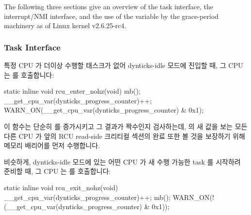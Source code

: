 The following three sections give an overview of the task
interface, the interrupt/NMI interface, and the use of
the  variable by the
grace-period machinery as of Linux kernel v2.6.25-rc4.

\fi

\subsubsection{Task Interface}
\label{sec:formal:Task Interface}

특정 CPU 가 더이상 수행할 태스크가 없어 dynticks-idle 모드에 진입할 때, 그 CPU
는  를 호출합니다:

\iffalse

When a given CPU enters dynticks-idle mode because it has no more
tasks to run, it invokes \co{rcu_enter_nohz()}:

\fi

\begin{VerbatimN}
static inline void rcu_enter_nohz(void)
{
	mb();
	__get_cpu_var(dynticks_progress_counter)++;
	WARN_ON(__get_cpu_var(dynticks_progress_counter) &
	        0x1);
}
\end{VerbatimN}

이 함수는 단순히  를 증가시키고 그 결과가
짝수인지 검사하는데,  의 새 값을 보는 모든 다른
CPU 가 앞의 RCU read-side 크리티컬 섹션의 완료 또한 볼 것을 보장하기 위해
메모리 배리어를 먼저 수행합니다.

비슷하게, dynticks-idle 모드에 있는 어떤 CPU 가 새 수행 가능한 task 를 시작하려
준비할 때, 그 CPU 는  를 호출합니다:

\iffalse

This function simply increments \co{dynticks_progress_counter} and
checks that the result is even, but first executing a memory barrier
to ensure that any other CPU that sees the new value of
\co{dynticks_progress_counter} will also see the completion
of any prior RCU read-side critical sections.

Similarly, when a CPU that is in dynticks-idle mode prepares to
start executing a newly runnable task, it invokes
\co{rcu_exit_nohz()}:

\fi

\begin{VerbatimN}
static inline void rcu_exit_nohz(void)
{
	__get_cpu_var(dynticks_progress_counter)++;
	mb();
	WARN_ON(!(__get_cpu_var(dynticks_progress_counter) &
	          0x1));
}
\end{VerbatimN}


